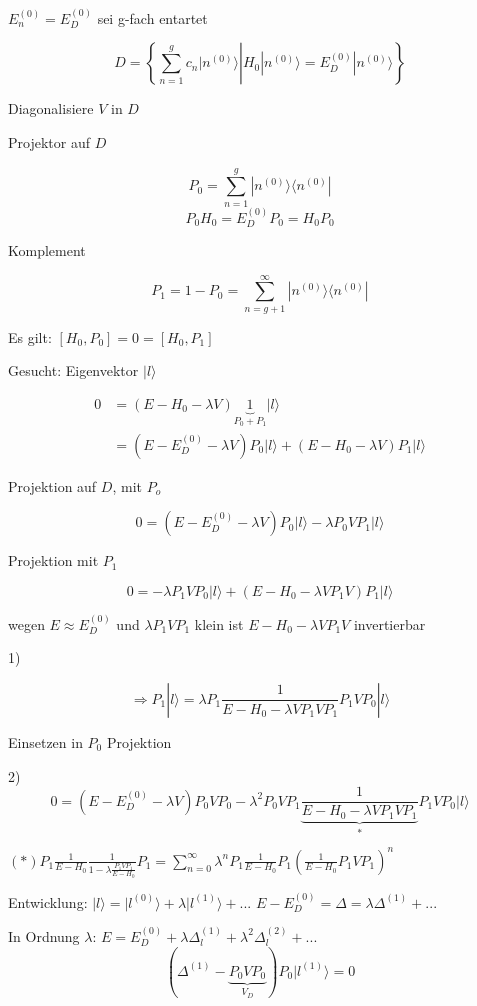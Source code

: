 \( E^{(0)}_n = E^{(0)}_D\) sei g-fach entartet

\[ D =  \left\{ \left. \sum^g_{n=1} c_n |n^{(0)}\rangle \right| H_0 |n^{(0)}\rangle = E^{(0)}_D|n^{(0)}\rangle \right\}\]

Diagonalisiere \(V\) in \(D\)

Projektor auf \(D\)

\[ P_0 = \sum^g_{n=1} |n^{(0)}\rangle\langle n^{(0)}|\]
\[ P_0H_0 = E^{(0)}_D P_0 = H_0 P_0\]

Komplement

\[ P_1 = 1-P_0 = \sum^\infty_{n=g+1} |n^{(0)}\rangle\langle n^{(0)}|\]

Es gilt: \([H_0,P_0]=0=[H_0,P_1]\)



Gesucht: Eigenvektor \(|l\rangle\)

\begin{align}
0 &= (E-H_0-\lambda V)\underbrace{1}_{P_0+P_1} |l\rangle \\&= (E-E^{(0)}_D-\lambda V)P_0 |l\rangle + (E-H_0-\lambda V)P_1|l\rangle
\end{align}

Projektion auf \(D\), mit \(P_o\)

\[ 0=(E-E^{(0)}_D-\lambda V)P_0 |l\rangle -  \lambda P_0 V P_1 |l\rangle \]

Projektion mit \(P_1\)

\[ 0= -  \lambda P_1 V P_0 |l\rangle +  (E-H_0-\lambda V P_1 V)P_1
|l\rangle\]

wegen \(E\approx E^{(0)}_D\) und \(\lambda P_1VP_1\) klein ist \(E-H_0-\lambda V P_1 V\) invertierbar

1)

\[\Rightarrow P_1|l\rangle = \lambda P_1 \frac 1 {E-H_0-\lambda V P_1
  V P_1} P_1 V P_0 |l\rangle\]

Einsetzen in \(P_0\) Projektion

2)
\[ 0=(E-E^{(0)}_D-\lambda V)P_0 V P_0 - \lambda^2 P_0 VP_1
\underbrace{\frac {1} {E-H_0-\lambda V P_1 V P_1}}_{*} P_1 V P_0 |l\rangle\]

\((*) P_1\frac 1{E-H_0}\frac 1 {1-\lambda\frac{P_1VP_1}{E-H_0}}P_1= \sum^\infty_{n=0}\lambda^n P_1\frac 1 {E-H_0} P_1(\frac 1 {E-H_0} P_1VP_1)^n \)

 

Entwicklung: \(|l\rangle =|l^{(0)}\rangle +\lambda|l^{(1)}\rangle +...\) \(E-E^{(0)}_D = \Delta = \lambda\Delta^{(1)}+...\)

In Ordnung \(\lambda\): \(E=E^{(0)}_D+\lambda\Delta^{(1)}_l + \lambda^2\Delta^{(2)}_l+...\)
\[ (\Delta^{(1)}-\underbrace{P_0VP_0}_{V_D})P_0|l^{(1)}\rangle = 0\]

